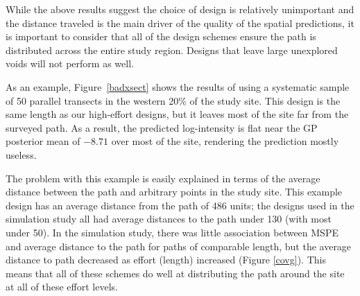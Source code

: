 \documentclass[review]{elsarticle}
\begin{document}
While the above results suggest the choice of design is relatively unimportant
and the distance traveled is the main driver of the quality of the spatial
predictions, it is important to consider that all of the design schemes ensure
the path is distributed across the entire study region. Designs that leave
large unexplored voids will not perform as well.

As an example, Figure~\ref{badxsect} shows the results of using a systematic
sample of 50 parallel transects in the western 20\% of the study site. This
design is the same length as our high-effort designs, but it leaves most of the
site far from the surveyed path. As a result, the predicted log-intensity is
flat near the GP posterior mean of \(-8.71\) over most of the site, rendering
the prediction mostly useless.

The problem with this example is easily explained in terms of the average
distance between the path and arbitrary points in the study site. This example
design has an average distance from the path of 486 units; the designs used in
the simulation study all had average distances to the path under 130 (with most
under 50). In the simulation study, there was little association between
MSPE and average distance to the path for paths of comparable length, but the
average distance to path decreased as effort (length) increased
(Figure \ref{covg}). This means that all of these schemes do well at
distributing the path around the site at all of these effort levels.
\end{document}
